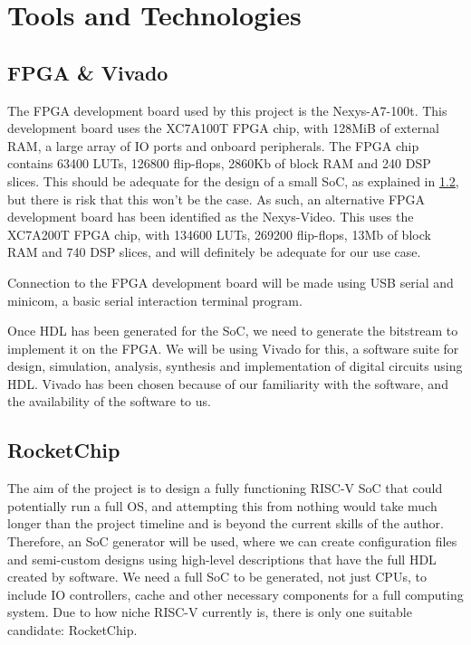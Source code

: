 \chapter{Tools and Technologies}
\label{ch:tools_technologies}
\section{FPGA \& Vivado}
The FPGA development board used by this project is the Nexys-A7-100t. This development board uses the XC7A100T FPGA chip, with 128MiB of external RAM, a large array of IO ports and onboard peripherals. The FPGA chip contains 63400 LUTs, 126800 flip-flops, 2860Kb of block RAM and 240 DSP slices. This should be adequate for the design of a small SoC, as explained in \ref{rocketchip}, but there is risk that this won't be the case. As such, an alternative FPGA development board has been identified as the Nexys-Video. This uses the XC7A200T FPGA chip, with 134600 LUTs, 269200 flip-flops, 13Mb of block RAM and 740 DSP slices, and will definitely be adequate for our use case.

Connection to the FPGA development board will be made using USB serial and minicom\cite{minicom}, a basic serial interaction terminal program.

Once HDL has been generated for the SoC, we need to generate the bitstream to implement it on the FPGA. We will be using Vivado for this, a software suite for design, simulation, analysis, synthesis and implementation of digital circuits using HDL. Vivado has been chosen because of our familiarity with the software, and the availability of the software to us.

\section{RocketChip} %
\label{rocketchip}
The aim of the project is to design a fully functioning RISC-V SoC that could potentially run a full OS, and attempting this from nothing would take much longer than the project timeline and is beyond the current skills of the author. Therefore, an SoC generator will be used, where we can create configuration files and semi-custom designs using high-level descriptions that have the full HDL created by software. We need a full SoC to be generated, not just CPUs, to include IO controllers, cache and other necessary components for a full computing system. Due to how niche RISC-V currently is, there is only one suitable candidate: RocketChip\cite{rocketchip}.

